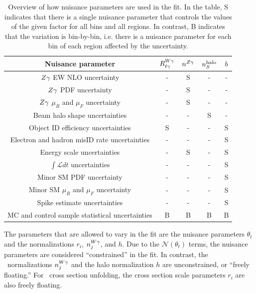 \begin{table}[htbp]
  \begin{center}
    \caption{
      Overview of how nuisance parameters are used in the fit. In the table, S indicates that there is a single
      nuisance parameter that controls the values of the given factor for all \ETgamma bins and all regions.
      In contrast, B indicates that the variation is bin-by-bin, i.e. there is a nuisance parameter for each
      bin of each region affected by the uncertainty.
    }
    \label{tab:nuisance_params}
    \begin{tabular}{| c | c | c | c | c |}
      \hline
      Nuisance parameter & $\RWl$ & $\nZg$ & $\nhalo$ & $b$ \\
      \hline
      \hline
      $\PZ\Pgamma$ EW NLO uncertainty & - & S & - & - \\
      \hline
      $\PZ\Pgamma$ PDF uncertainty & - & S & - & - \\
      \hline
      $\PZ\Pgamma$ $\mu_{R}$ and $\mu_{F}$ uncertainty & - & S & - & - \\
      \hline
      Beam halo shape uncertainties & - & - & S & - \\
      \hline
      Object ID efficiency uncertainties & S & - & - & S \\
      \hline
      Electron and hadron misID rate uncertainties & - & - & - & S \\
      \hline
      Energy scale uncertainties & - & S & - & S \\
      \hline
      $\int\mathcal{L}dt$ uncertainties & - & - & - & S \\
      \hline
      Minor SM PDF uncertainty & - & - & - & S \\
      \hline
      Minor SM $\mu_{R}$ and $\mu_{F}$ uncertainty & - & - & - & S \\
      \hline
      Spike estimate uncertainties & - & - & - & S \\
      \hline
      MC and control sample statistical uncertainties & B & B & B & B \\
      \hline
    \end{tabular}
  \end{center}
\end{table}

The parameters that are allowed to vary in the fit are the nuisance parameters $\theta_{t}$ and the normalizations $r_{i}$, $\nWg[j]$, and $h$.
Due to the $\mathcal{N}(\theta_t)$ terms, the nuisance parameters are considered ``constrained'' in the fit.
In contrast, the \wlng\ normalizations $\nWg[j]$ and the halo normalization $h$ are unconstrained, or ``freely floating.''
For \zinvg\ cross section unfolding, the cross section scale parameters $r_{i}$ are also freely floating.

